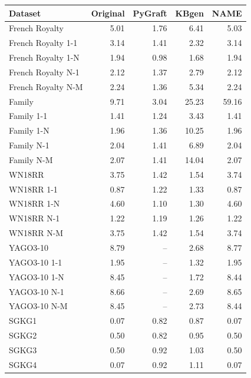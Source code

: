 \begin{tabular}{lrrrr}
\toprule
Dataset & Original & PyGraft & KBgen & NAME \\
\midrule
French Royalty & 5.01 & 1.76 & 6.41 & 5.03 \\
French Royalty 1-1 & 3.14 & 1.41 & 2.32 & 3.14 \\
French Royalty 1-N & 1.94 & 0.98 & 1.68 & 1.94 \\
French Royalty N-1 & 2.12 & 1.37 & 2.79 & 2.12 \\
French Royalty N-M & 2.24 & 1.36 & 5.34 & 2.24 \\
\midrule
Family & 9.71 & 3.04 & 25.23 & 59.16 \\
Family 1-1 & 1.41 & 1.24 & 3.43 & 1.41 \\
Family 1-N & 1.96 & 1.36 & 10.25 & 1.96 \\
Family N-1 & 2.04 & 1.41 & 6.89 & 2.04 \\
Family N-M & 2.07 & 1.41 & 14.04 & 2.07 \\
\midrule
WN18RR & 3.75 & 1.42 & 1.54 & 3.74 \\
WN18RR 1-1 & 0.87 & 1.22 & 1.33 & 0.87 \\
WN18RR 1-N & 4.60 & 1.10 & 1.30 & 4.60 \\
WN18RR N-1 & 1.22 & 1.19 & 1.26 & 1.22 \\
WN18RR N-M & 3.75 & 1.42 & 1.54 & 3.74 \\
\midrule
YAGO3-10 & 8.79 & – & 2.68 & 8.77 \\
YAGO3-10 1-1 & 1.95 & – & 1.32 & 1.95 \\
YAGO3-10 1-N & 8.45 & – & 1.72 & 8.44 \\
YAGO3-10 N-1 & 8.66 & – & 2.69 & 8.65 \\
YAGO3-10 N-M & 8.45 & – & 2.73 & 8.44 \\
\midrule
SGKG1 & 0.07 & 0.82 & 0.87 & 0.07 \\
SGKG2 & 0.50 & 0.82 & 0.95 & 0.50 \\
SGKG3 & 0.50 & 0.92 & 1.03 & 0.50 \\
SGKG4 & 0.07 & 0.92 & 1.11 & 0.07 \\
\bottomrule
\end{tabular}
